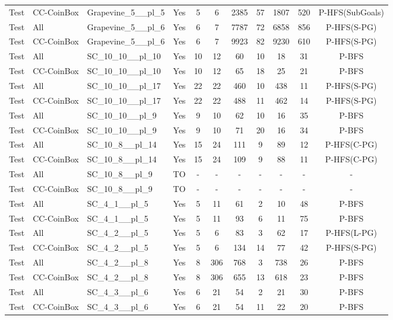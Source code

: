 \documentclass{article}
\begin{document}
\begin{tabular}{lllcccccccc}
Test & CC-CoinBox & Grapevine\_5\_\_pl\_5 & Yes & 5 & 6 & 2385 & 57 & 1807 & 520 & P-HFS(SubGoals) \\
Test & All & Grapevine\_5\_\_pl\_6 & Yes & 6 & 7 & 7787 & 72 & 6858 & 856 & P-HFS(S-PG) \\
Test & CC-CoinBox & Grapevine\_5\_\_pl\_6 & Yes & 6 & 7 & 9923 & 82 & 9230 & 610 & P-HFS(S-PG) \\
Test & All & SC\_10\_10\_\_pl\_10 & Yes & 10 & 12 & 60 & 10 & 18 & 31 & P-BFS \\
Test & CC-CoinBox & SC\_10\_10\_\_pl\_10 & Yes & 10 & 12 & 65 & 18 & 25 & 21 & P-BFS \\
Test & All & SC\_10\_10\_\_pl\_17 & Yes & 22 & 22 & 460 & 10 & 438 & 11 & P-HFS(S-PG) \\
Test & CC-CoinBox & SC\_10\_10\_\_pl\_17 & Yes & 22 & 22 & 488 & 11 & 462 & 14 & P-HFS(S-PG) \\
Test & All & SC\_10\_10\_\_pl\_9 & Yes & 9 & 10 & 62 & 10 & 16 & 35 & P-BFS \\
Test & CC-CoinBox & SC\_10\_10\_\_pl\_9 & Yes & 9 & 10 & 71 & 20 & 16 & 34 & P-BFS \\
Test & All & SC\_10\_8\_\_pl\_14 & Yes & 15 & 24 & 111 & 9 & 89 & 12 & P-HFS(C-PG) \\
Test & CC-CoinBox & SC\_10\_8\_\_pl\_14 & Yes & 15 & 24 & 109 & 9 & 88 & 11 & P-HFS(C-PG) \\
Test & All & SC\_10\_8\_\_pl\_9 & TO & - & - & - & - & - & - & - \\
Test & CC-CoinBox & SC\_10\_8\_\_pl\_9 & TO & - & - & - & - & - & - & - \\
Test & All & SC\_4\_1\_\_pl\_5 & Yes & 5 & 11 & 61 & 2 & 10 & 48 & P-BFS \\
Test & CC-CoinBox & SC\_4\_1\_\_pl\_5 & Yes & 5 & 11 & 93 & 6 & 11 & 75 & P-BFS \\
Test & All & SC\_4\_2\_\_pl\_5 & Yes & 5 & 6 & 83 & 3 & 62 & 17 & P-HFS(L-PG) \\
Test & CC-CoinBox & SC\_4\_2\_\_pl\_5 & Yes & 5 & 6 & 134 & 14 & 77 & 42 & P-HFS(S-PG) \\
Test & All & SC\_4\_2\_\_pl\_8 & Yes & 8 & 306 & 768 & 3 & 738 & 26 & P-BFS \\
Test & CC-CoinBox & SC\_4\_2\_\_pl\_8 & Yes & 8 & 306 & 655 & 13 & 618 & 23 & P-BFS \\
Test & All & SC\_4\_3\_\_pl\_6 & Yes & 6 & 21 & 54 & 2 & 21 & 30 & P-BFS \\
Test & CC-CoinBox & SC\_4\_3\_\_pl\_6 & Yes & 6 & 21 & 54 & 11 & 22 & 20 & P-BFS \\

\end{tabular}
\end{document}
